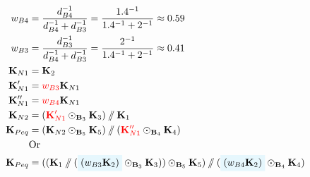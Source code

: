 \begin{equation}
\begin{split}
    w_{B4} &= \frac{d_{B4}^{-1}}{d_{B4}^{-1} + d_{B3}^{-1}} = \frac{1.4^{-1}}{1.4^{-1} + 2^{-1}} \approx 0.59  \\
    w_{B3} &= \frac{d_{B3}^{-1}}{d_{B4}^{-1} + d_{B3}^{-1}} = \frac{2^{-1}}{1.4^{-1} + 2^{-1}} \approx 0.41  \\
    \mathbf{K}_{N1} &= \mathbf{K}_2 \\
    \mathbf{K}_{N1}' &= \textcolor{red}{w_{B3}} \mathbf{K}_{N1} \\
    \mathbf{K}_{N1}'' &= \textcolor{red}{w_{B4}} \mathbf{K}_{N1} \\
    \mathbf{K}_{N2} &= (\textcolor{red}{\mathbf{K}_{N1}'} \stiffseries_{\mathbf{B}_3} \mathbf{K}_3) \stiffparallel \mathbf{K}_1\\
    \mathbf{K}_{Peq} &= (\mathbf{K}_{N2} \stiffseries_{\mathbf{B}_5} \mathbf{K}_{5}) \stiffparallel (\textcolor{red}{\mathbf{K}_{N1}''} \stiffseries_{\mathbf{B}_4} \mathbf{K}_{4}) \\
    &\text{Or} \\
    \mathbf{K}_{Peq} &= ((\mathbf{K}_{1} \stiffparallel (\colorbox{cyan!10}{$(w_{B3}\mathbf{K}_{2})$} \stiffseries_{\mathbf{B}_3} \mathbf{K}_3) ) \stiffseries_{\mathbf{B}_5} \mathbf{K}_{5}) \stiffparallel (\colorbox{cyan!10}{$(w_{B4}\mathbf{K}_{2})$} \stiffseries_{\mathbf{B}_4} \mathbf{K}_4)
\end{split}
\label{for:wdag_eq}
\end{equation}


